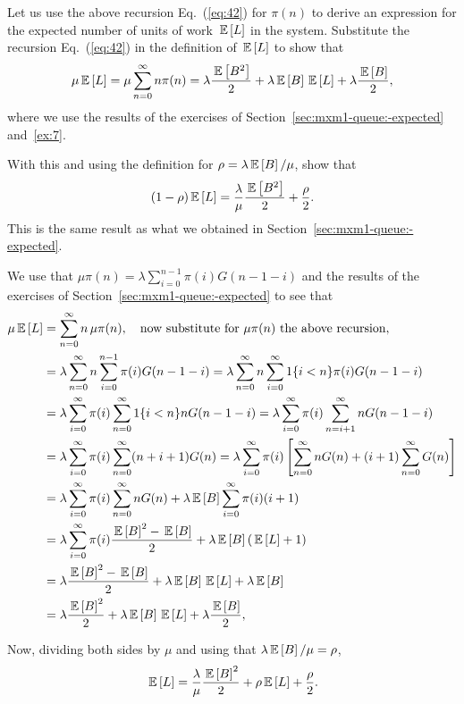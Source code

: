 \begin{question}\label{ex:7}
  Let us use the above recursion Eq.~(\ref{eq:42}) for $\pi(n)$ to
  derive an expression for the expected number of units of work $\,\mathbb{E}\left[L\right]$
  in the system. Substitute the recursion Eq.~(\ref{eq:42}) in the
  definition of $\,\mathbb{E}\left[L\right]$ to show that
\begin{equation}\label{eq:67}
  \mu \,\mathbb{E}\left[L\right] =\mu \sum_{n=0}^\infty n \pi(n) = \lambda \frac{\,\mathbb{E}\left[B^2\right]}2  + \lambda \,\mathbb{E}\left[B\right] \,\mathbb{E}\left[L\right] +\lambda \frac{\,\mathbb{E}\left[B\right]}2,
\end{equation}
where we use the results of the exercises of Section~\ref{sec:mxm1-queue:-expected}
and~\ref{ex:7}. 

With this and using the definition for
$\rho=\lambda \,\mathbb{E}\left[B\right]/\mu$, show that
\begin{equation*}
(1- \rho) \,\mathbb{E}\left[L\right] = \frac{\lambda}\mu \frac{\,\mathbb{E}\left[B^2\right]}2 + \frac\rho2.
\end{equation*}
This is the same result as what we obtained in
Section~\ref{sec:mxm1-queue:-expected}.
\begin{solution}
  We use that $\mu \pi(n) =\lambda \sum_{i=0}^{n-1} \pi(i) G(n-1-i)$
  and the results of the exercises of
  Section~\ref{sec:mxm1-queue:-expected} to see that
\begin{align*}
  \mu \,\mathbb{E}\left[L\right]
  &=\sum_{n=0}^\infty n\, \mu \pi(n), \quad \text{now substitute for $\mu \pi(n)$ the above recursion}, \\
& =\lambda \sum_{n=0}^\infty n \sum_{i=0}^{n-1} \pi(i) G(n-1-i) 
  =\lambda \sum_{n=0}^\infty n \sum_{i=0}^\infty 1\{i<n\} \pi(i) G(n-1-i) \\
& =\lambda \sum_{i=0}^\infty \pi(i) \sum_{n=0}^\infty 1\{i<n\} n G(n-1-i) 
  =\lambda \sum_{i=0}^\infty \pi(i) \sum_{n=i+1}^\infty n G(n-1-i) \\
& =\lambda \sum_{i=0}^\infty \pi(i) \sum_{n=0}^\infty (n+i+1) G(n) 
  =\lambda \sum_{i=0}^\infty \pi(i) \left[\sum_{n=0}^\infty n G(n) +(i+1) \sum_{n=0}^\infty G(n)\right]  \\
  &=\lambda \sum_{i=0}^\infty \pi(i)\sum_{n=0}^\infty n G(n) +\lambda  \,\mathbb{E}\left[B\right] \sum_{i=0}^\infty \pi(i) (i+1)  \\ 
  &=\lambda \sum_{i=0}^\infty \pi(i) \frac{\,\mathbb{E}\left[B\right]^2 -\,\mathbb{E}\left[B\right]}2  + \lambda \,\mathbb{E}\left[B\right] (\,\mathbb{E}\left[L\right] +1)  \\ 
  &= \lambda \frac{\,\mathbb{E}\left[B\right]^2 -\,\mathbb{E}\left[B\right]}2  + \lambda \,\mathbb{E}\left[B\right] \,\mathbb{E}\left[L\right] +\lambda \,\mathbb{E}\left[B\right] \\
  &= \lambda \frac{\,\mathbb{E}\left[B\right]^2 }2  + \lambda \,\mathbb{E}\left[B\right] \,\mathbb{E}\left[L\right] +\lambda \frac{\,\mathbb{E}\left[B\right]}2,
\end{align*}

Now, dividing both sides by $\mu$ and using that $\lambda \,\mathbb{E}\left[B\right]/\mu = \rho$, 
\begin{equation*}
  \,\mathbb{E}\left[L\right] = \frac{\lambda}{\mu}  \frac{\,\mathbb{E}\left[B\right]^2 }2 + \rho \,\mathbb{E}\left[L\right] + \frac\rho2.
\end{equation*}

\end{solution}
\end{question}


